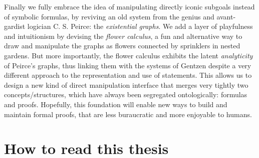 Finally we fully embrace the idea of manipulating directly iconic subgoals
instead of symbolic formulas, by reviving an old system from the genius and
avant-gardist logician C. S. Peirce: the \emph{existential graphs}. We add a
layer of playfulness and intuitionism by devising the \emph{flower calculus}, a
fun and alternative way to draw and manipulate the graphs as flowers connected
by sprinklers in nested gardens. But more importantly, the flower calculus
exhibits the latent \emph{analyticity} of Peirce's graphs, thus linking them
with the systems of Gentzen despite a very different approach to the
representation and use of statements. This allows us to design a new kind of
direct manipulation interface that merges very tightly two concepts/structures,
which have always been segregated ontologically: formulas and proofs. Hopefully,
this foundation will enable new ways to build and maintain formal proofs, that
are less buraucratic and more enjoyable to humans.


\section{How to read this thesis}

